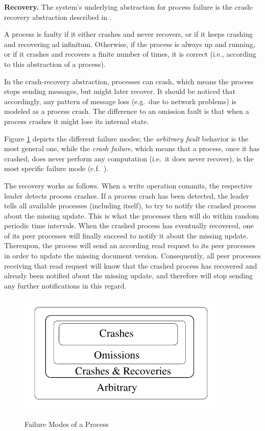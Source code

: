 \noindent
{\bf Recovery.}
The system's underlying abstraction for process failure is the crash-recovery abstraction described in \cite[p.~32ff]{GR06}.

A process is faulty if it either crashes and never recovers, or if it keeps crashing and recovering ad infinitum. Otherwise, if the process is always up and running, or if it crashes and recovers a finite number of times, it is correct (i.e., according to this abstraction of a process).

In the crash-recovery abstraction, processes can crash, which means the process stops sending messages, but might later recover. It should be noticed that accordingly, any pattern of message loss (e.g.\ due to network problems) is modeled as a process crash. The difference to an omission fault is that when a process crashes it might lose its internal state.

Figure \ref{failure_modes_of_a_process} depicts the different failure modes; the \emph{arbitrary fault} behavior is the most general one, while the \emph{crash failure}, which means that a process, once it has crashed, does never perform any computation (i.e.\ it does never recover), is the most specific failure mode (c.f.\ \cite[p.~29]{GR06}).

The recovery works as follows. When a write operation commits, the respective leader detects process crashes. If a process crash has been detected, the leader tells all available processes (including itself), to try to notify the crashed process about the missing update. This is what the processes then will do within random periodic time intervals. When the crashed process has eventually recovered, one of its peer processes will finally succeed to notify it about the missing update. Thereupon, the process will send an according read request to its peer processes in order to update the missing document version. Consequently, all peer processes receiving that read request will know that the crashed process has recovered and already been notified about the missing update, and therefore will stop sending any further notifications in this regard. 


\begin{figure}
    \centering
	{\includegraphics[width=100mm]{figures/failure_modes_of_a_process}}
    \caption{Failure Modes of a Process \cite[p.~30]{GR06}}
    \label{failure_modes_of_a_process}
\end{figure}

